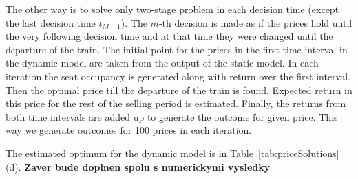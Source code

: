 The other way is to solve only two-stage problem in each decision time (except the last decision time $t_{M-1}$). The $m$-th decision is made as if the prices hold until the very following decision time and at that time they were changed until the departure of the train. The initial point for the prices in the first time interval in the dynamic model are taken from the output of the static model. In each iteration the seat occupancy is generated along with return over the first interval. Then the optimal price till the departure of the train is found. Expected return in this price for the rest of the selling period is estimated. Finally, the returns from both time intervals are added up to generate the outcome for given price. This way we generate outcomes for 100 prices in each iteration.

The estimated optimum for the dynamic model is in Table~\ref{tab:priceSolutions} (d). \textbf{\color{red} Zaver bude doplnen spolu s numerickymi vysledky}







